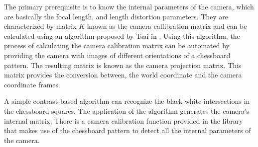 The primary prerequisite is to know the internal parameters of the camera, which are basically the focal length, and length distortion parameters. They are characterized by matrix $K$ known as the camera callibration matrix and can be calculated using an algorithm proposed by Tsai in \cite{horn2000tsai}. Using this algorithm, the process of calculating the camera calibration matrix can be automated by providing the camera with images of different orientations of a chessboard pattern. The resulting matrix is known as the camera projection matrix. This matrix provides the conversion between, the world coordinate and the camera coordinate frames. 

A simple contrast-based algorithm can recognize the black-white intersections in the chessboard squares. The application of the algorithm generates the camera's internal matrix. There is a camera calibration function provided in the library that makes use of the chessboard pattern to detect all the internal parameters of the camera.

